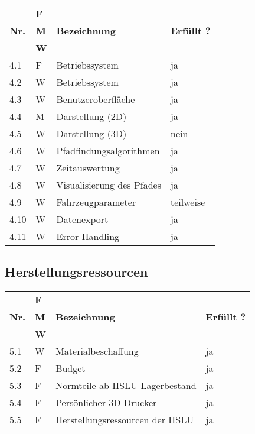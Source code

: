 \documentclass[main.tex]{subfiles} %
\begin{document}
\begin{tabular}{|l|p{0.5cm}|p{4cm}|p{10cm}|}
  \hline
               & \textbf{F} &                           &                    \\
  \textbf{Nr.} & \textbf{M} & \textbf{Bezeichnung}      & \textbf{Erfüllt ?} \\
               & \textbf{W} &                           &                    \\
  \hline
  4.1          & F          & Betriebssystem            & ja                 \\
  4.2          & W          & Betriebssystem            & ja                 \\
  4.3          & W          & Benutzeroberfläche        & ja                 \\
  4.4          & M          & Darstellung (2D)          & ja                 \\
  4.5          & W          & Darstellung (3D)          & nein               \\
  4.6          & W          & Pfadfindungsalgorithmen   & ja                 \\
  4.7          & W          & Zeitauswertung            & ja                 \\
  4.8          & W          & Visualisierung des Pfades & ja                 \\
  4.9          & W          & Fahrzeugparameter         & teilweise          \\
  4.10         & W          & Datenexport               & ja                 \\
  4.11         & W          & Error-Handling            & ja                 \\
  \hline
\end{tabular}

\subsection*{Herstellungsressourcen}

\begin{tabular}{|l|p{0.5cm}|p{4cm}|p{10cm}|}
  \hline
               & \textbf{F} &                                 &                    \\
  \textbf{Nr.} & \textbf{M} & \textbf{Bezeichnung}            & \textbf{Erfüllt ?} \\
               & \textbf{W} &                                 &                    \\
  \hline
  5.1          & W          & Materialbeschaffung             & ja                 \\
  5.2          & F          & Budget                          & ja                 \\
  5.3          & F          & Normteile ab HSLU Lagerbestand  & ja                 \\
  5.4          & F          & Persönlicher 3D-Drucker         & ja                 \\
  5.5          & F          & Herstellungsressourcen der HSLU & ja                 \\
  \hline
\end{tabular}

\newpage
\end{document}
